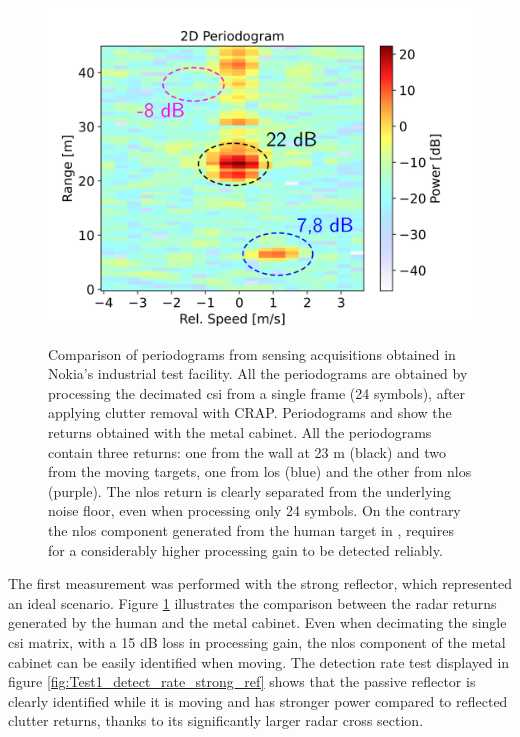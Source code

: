 \begin{figure}[H]
{		\includegraphics[scale=0.45]{Images/Test1/per_strong_ref/db_1frame_dec_CRAP_HUMAN_labelled_text22.png}
	}
	\caption[]{\small Comparison of periodograms from sensing acquisitions obtained in Nokia's industrial test facility.
		All the periodograms are obtained by processing the decimated \gls{csi} from a single frame (24 symbols), after applying clutter removal with CRAP.
		Periodograms  and  show the returns obtained with the metal cabinet. All the periodograms contain three returns: one from the wall at 23 m (black) and two from the moving targets, one from \gls{los} (blue) and the other from \gls{nlos} (purple). The \gls{nlos} return is clearly separated from the underlying noise floor, even when processing only 24 symbols. On the contrary the \gls{nlos} component generated from the human target in , requires for a considerably higher processing gain to be detected reliably.}
	\label{fig:Test1_metal-human_comparison}
	\end{figure}
The first measurement was performed with the strong reflector, which represented an ideal scenario. 
Figure \ref{fig:Test1_metal-human_comparison} illustrates the comparison between the radar returns generated by the human and the metal cabinet. 
Even when decimating the single \gls{csi} matrix, with a 15 dB loss in processing gain, the \gls{nlos} component of the metal cabinet can be easily identified when moving.
The detection rate test displayed in figure \ref{fig:Test1_detect_rate_strong_ref} shows that the passive reflector is clearly identified while it is moving and has stronger power compared to reflected clutter returns, thanks to its significantly larger radar cross section.
